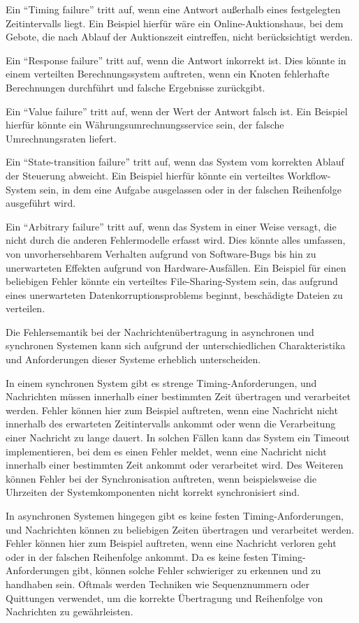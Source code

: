 Ein \enquote{Timing failure}  tritt auf, wenn eine Antwort außerhalb eines festgelegten Zeitintervalls liegt. Ein Beispiel hierfür wäre ein Online-Auktionshaus, bei dem Gebote, die nach Ablauf der Auktionszeit eintreffen, nicht berücksichtigt werden.

Ein \enquote{Response failure} tritt auf, wenn die Antwort inkorrekt ist. Dies könnte in einem verteilten Berechnungssystem auftreten, wenn ein Knoten fehlerhafte Berechnungen durchführt und falsche Ergebnisse zurückgibt.

Ein \enquote{Value failure}  tritt auf, wenn der Wert der Antwort falsch ist. Ein Beispiel hierfür könnte ein Währungsumrechnungsservice sein, der falsche Umrechnungsraten liefert.

Ein \enquote{State-transition failure} tritt auf, wenn das System vom korrekten Ablauf der Steuerung abweicht. Ein Beispiel hierfür könnte ein verteiltes Workflow-System sein, in dem eine Aufgabe ausgelassen oder in der falschen Reihenfolge ausgeführt wird.

Ein \enquote{Arbitrary failure} tritt auf, wenn das System in einer Weise versagt, die nicht durch die anderen Fehlermodelle erfasst wird. Dies könnte alles umfassen, von unvorhersehbarem Verhalten aufgrund von Software-Bugs bis hin zu unerwarteten Effekten aufgrund von Hardware-Ausfällen. Ein Beispiel für einen beliebigen Fehler könnte ein verteiltes File-Sharing-System sein, das aufgrund eines unerwarteten Datenkorruptionsproblems beginnt, beschädigte Dateien zu verteilen.

Die Fehlersemantik bei der Nachrichtenübertragung in asynchronen und synchronen Systemen kann sich aufgrund der unterschiedlichen Charakteristika und Anforderungen dieser Systeme erheblich unterscheiden.

In einem synchronen System gibt es strenge Timing-Anforderungen, und Nachrichten müssen innerhalb einer bestimmten Zeit übertragen und verarbeitet werden. Fehler können hier zum Beispiel auftreten, wenn eine Nachricht nicht innerhalb des erwarteten Zeitintervalls ankommt oder wenn die Verarbeitung einer Nachricht zu lange dauert. In solchen Fällen kann das System ein Timeout implementieren, bei dem es einen Fehler meldet, wenn eine Nachricht nicht innerhalb einer bestimmten Zeit ankommt oder verarbeitet wird. Des Weiteren können Fehler bei der Synchronisation auftreten, wenn beispielsweise die Uhrzeiten der Systemkomponenten nicht korrekt synchronisiert sind.

In asynchronen Systemen hingegen gibt es keine festen Timing-Anforderungen, und Nachrichten können zu beliebigen Zeiten übertragen und verarbeitet werden. Fehler können hier zum Beispiel auftreten, wenn eine Nachricht verloren geht oder in der falschen Reihenfolge ankommt. Da es keine festen Timing-Anforderungen gibt, können solche Fehler schwieriger zu erkennen und zu handhaben sein. Oftmals werden Techniken wie Sequenznummern oder Quittungen verwendet, um die korrekte Übertragung und Reihenfolge von Nachrichten zu gewährleisten.

